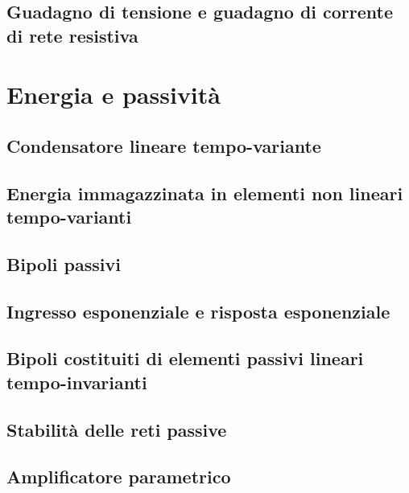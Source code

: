 \documentclass[a4paper,12pt]{article}
\theoremstyle{mystyle}
\begin{document}
\subsection{Guadagno di tensione e guadagno di corrente di rete resistiva}


\section{Energia e passività}
\subsection{Condensatore lineare tempo-variante}
\subsection{Energia immagazzinata in elementi non lineari tempo-varianti}
\subsection{Bipoli passivi}
\subsection{Ingresso esponenziale e risposta esponenziale}
\subsection{Bipoli costituiti di elementi passivi lineari tempo-invarianti}
\subsection{Stabilità delle reti passive}
\subsection{Amplificatore parametrico}


\end{document}
